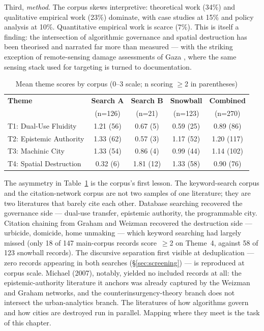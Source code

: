 Third, \textit{method}. The corpus skews interpretive: theoretical work (34\%) and qualitative empirical work (23\%) dominate, with case studies at 15\% and policy analysis at 10\%. Quantitative empirical work is scarce (7\%). This is itself a finding: the intersection of algorithmic governance and spatial destruction has been theorised and narrated far more than measured — with the striking exception of remote-sensing damage assessments of Gaza \parencite{holail2024}, where the same sensing stack used for targeting is turned to documentation.

\begin{table}[H]
\centering
\small
\caption{Mean theme scores by corpus (0–3 scale; n scoring $\geq$2 in parentheses)}
\label{tab:themes}
\begin{tabular}{lcccc}
\toprule
\textbf{Theme} & \textbf{Search A} & \textbf{Search B} & \textbf{Snowball} & \textbf{Combined} \\
 & (n=126) & (n=21) & (n=123) & (n=270) \\
\midrule
T1: Dual-Use Fluidity & 1.21 (56) & 0.67 (5) & 0.59 (25) & 0.89 (86) \\
T2: Epistemic Authority & 1.33 (62) & 0.57 (3) & 1.17 (52) & 1.20 (117) \\
T3: Machinic City & 1.33 (54) & 0.86 (4) & 0.99 (44) & 1.14 (102) \\
T4: Spatial Destruction & 0.32 (6) & 1.81 (12) & 1.33 (58) & 0.90 (76) \\
\bottomrule
\end{tabular}
\end{table}

The asymmetry in Table~\ref{tab:themes} is the corpus's first lesson. The keyword-search corpus and the citation-network corpus are not two samples of one literature; they are two literatures that barely cite each other. Database searching recovered the governance side — dual-use transfer, epistemic authority, the programmable city. Citation chaining from Graham and Weizman recovered the destruction side — urbicide, domicide, home unmaking — which keyword searching had largely missed (only 18 of 147 main-corpus records score~$\geq$2 on Theme~4, against 58 of 123 snowball records). The discursive separation first visible at deduplication — zero records appearing in both searches (§\ref{sec:screening}) — is reproduced at corpus scale. Michael (2007), notably, yielded no included records at all: the epistemic-authority literature it anchors was already captured by the Weizman and Graham networks, and the counterinsurgency-theory branch does not intersect the urban-analytics branch. The literatures of how algorithms govern and how cities are destroyed run in parallel. Mapping where they meet is the task of this chapter.

